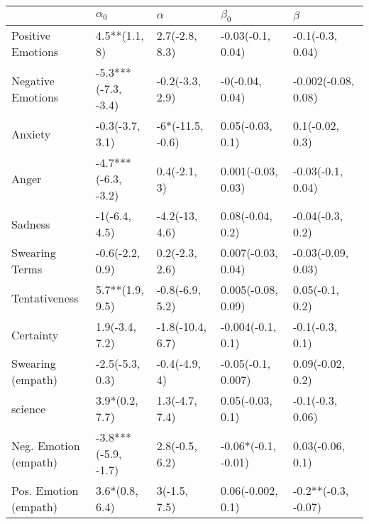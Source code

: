 \begin{tabular}{lllll}
\toprule
{} &           $\alpha_0$ &          $\alpha$ &            $\beta_0$ &              $\beta$ \\
\midrule
Positive Emotions     &        4.5**(1.1, 8) &    2.7(-2.8, 8.3) &    -0.03(-0.1, 0.04) &     -0.1(-0.3, 0.04) \\
Negative Emotions     &  -5.3***(-7.3, -3.4) &   -0.2(-3.3, 2.9) &      -0(-0.04, 0.04) &  -0.002(-0.08, 0.08) \\
Anxiety               &      -0.3(-3.7, 3.1) &  -6*(-11.5, -0.6) &     0.05(-0.03, 0.1) &      0.1(-0.02, 0.3) \\
Anger                 &  -4.7***(-6.3, -3.2) &      0.4(-2.1, 3) &   0.001(-0.03, 0.03) &    -0.03(-0.1, 0.04) \\
Sadness               &        -1(-6.4, 4.5) &    -4.2(-13, 4.6) &     0.08(-0.04, 0.2) &     -0.04(-0.3, 0.2) \\
Swearing Terms        &      -0.6(-2.2, 0.9) &    0.2(-2.3, 2.6) &   0.007(-0.03, 0.04) &   -0.03(-0.09, 0.03) \\
Tentativeness         &      5.7**(1.9, 9.5) &   -0.8(-6.9, 5.2) &   0.005(-0.08, 0.09) &      0.05(-0.1, 0.2) \\
Certainty             &       1.9(-3.4, 7.2) &  -1.8(-10.4, 6.7) &    -0.004(-0.1, 0.1) &      -0.1(-0.3, 0.1) \\
Swearing (empath)     &      -2.5(-5.3, 0.3) &     -0.4(-4.9, 4) &   -0.05(-0.1, 0.007) &     0.09(-0.02, 0.2) \\
science               &       3.9*(0.2, 7.7) &    1.3(-4.7, 7.4) &     0.05(-0.03, 0.1) &     -0.1(-0.3, 0.06) \\
Neg. Emotion (empath) &  -3.8***(-5.9, -1.7) &    2.8(-0.5, 6.2) &  -0.06*(-0.1, -0.01) &     0.03(-0.06, 0.1) \\
Pos. Emotion (empath) &       3.6*(0.8, 6.4) &      3(-1.5, 7.5) &    0.06(-0.002, 0.1) &  -0.2**(-0.3, -0.07) \\
\bottomrule
\end{tabular}
